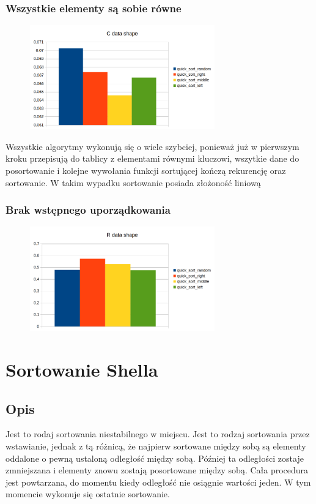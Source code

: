 \documentclass[]{article}
\begin{document}
		\subsubsection{Wszystkie elementy są sobie równe}
		\begin{figure}[H]
			\centering
			\includegraphics[width=8cm]{quick_sort_c.png}	
		\end{figure}
		Wszystkie algorytmy wykonują się o wiele szybciej, ponieważ już w pierwszym kroku przepisują do tablicy z elementami równymi kluczowi, wszytkie dane do posortowanie i kolejne wywołania funkcji sortującej kończą rekurencję oraz sortowanie. W takim wypadku sortowanie posiada złożoność liniową
		\subsubsection{Brak wstępnego uporządkowania}
		\begin{figure}[H]
			\centering
			\includegraphics[width=8cm]{quick_sort_r.png}	
		\end{figure}

\pagebreak
\section{Sortowanie Shella}
	\subsection{Opis}
		Jest to rodaj sortowania niestabilnego w miejscu. Jest to rodzaj sortowania przez wstawianie, jednak z tą różnicą, że najpierw sortowane między sobą są elementy oddalone o pewną ustaloną odległość między sobą. Później ta odległości zostaje zmniejszana i elementy znowu zostają posortowane między sobą. Cała procedura jest powtarzana, do momentu kiedy odległość nie osiągnie wartości jeden. W tym momencie wykonuje się ostatnie sortowanie.
\end{document}
